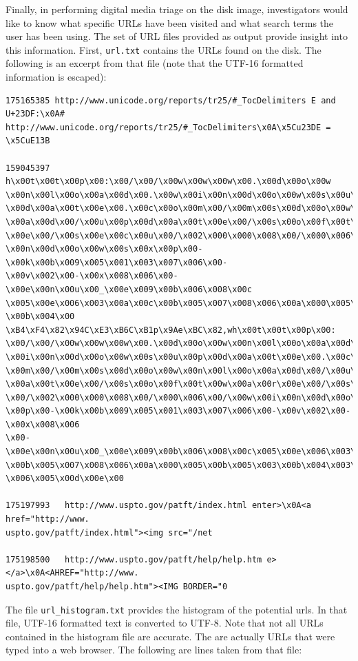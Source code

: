 Finally, in performing digital media triage on the disk image, investigators would like to know what specific URLs have been visited and what search terms the user has been using. The set of URL files provided as output provide insight into this information. First, \texttt{url.txt} contains the URLs found on the disk. The following is an excerpt from that file (note that the UTF-16 formatted information is escaped):
\lstset{style=customfile}
\begin{lstlisting} 
175165385 http://www.unicode.org/reports/tr25/#_TocDelimiters E and U+23DF:\x0A#
http://www.unicode.org/reports/tr25/#_TocDelimiters\x0A\x5Cu23DE = \x5CuE13B

159045397 h\x00t\x00t\x00p\x00:\x00/\x00/\x00w\x00w\x00w\x00.\x00d\x00o\x00w
\x00n\x00l\x00o\x00a\x00d\x00.\x00w\x00i\x00n\x00d\x00o\x00w\x00s\x00u\x00p
\x00d\x00a\x00t\x00e\x00.\x00c\x00o\x00m\x00/\x00m\x00s\x00d\x00o\x00w\x00n\x00l\x00o
\x00a\x00d\x00/\x00u\x00p\x00d\x00a\x00t\x00e\x00/\x00s\x00o\x00f\x00t\x00w\x00a\x00r
\x00e\x00/\x00s\x00e\x00c\x00u\x00/\x002\x000\x000\x008\x00/\x000\x006\x00/\x00w\x00i
\x00n\x00d\x00o\x00w\x00s\x00x\x00p\x00-\x00k\x00b\x009\x005\x001\x003\x007\x006\x00-
\x00v\x002\x00-\x00x\x008\x006\x00-\x00e\x00n\x00u\x00_\x00e\x009\x00b\x006\x008\x00c
\x005\x00e\x006\x003\x00a\x00c\x00b\x005\x007\x008\x006\x00a\x000\x005\x00b\x005\x003
\x00b\x004\x00 \xB4\xF4\x82\x94C\xE3\xB6C\xB1p\x9Ae\xBC\x82,wh\x00t\x00t\x00p\x00:
\x00/\x00/\x00w\x00w\x00w\x00.\x00d\x00o\x00w\x00n\x00l\x00o\x00a\x00d\x00.\x00w
\x00i\x00n\x00d\x00o\x00w\x00s\x00u\x00p\x00d\x00a\x00t\x00e\x00.\x00c\x00o
\x00m\x00/\x00m\x00s\x00d\x00o\x00w\x00n\x00l\x00o\x00a\x00d\x00/\x00u\x00p\x00d
\x00a\x00t\x00e\x00/\x00s\x00o\x00f\x00t\x00w\x00a\x00r\x00e\x00/\x00s\x00e\x00c\x00u
\x00/\x002\x000\x000\x008\x00/\x000\x006\x00/\x00w\x00i\x00n\x00d\x00o\x00w\x00s\x00x
\x00p\x00-\x00k\x00b\x009\x005\x001\x003\x007\x006\x00-\x00v\x002\x00-\x00x\x008\x006
\x00-\x00e\x00n\x00u\x00_\x00e\x009\x00b\x006\x008\x00c\x005\x00e\x006\x003\x00a\x00c
\x00b\x005\x007\x008\x006\x00a\x000\x005\x00b\x005\x003\x00b\x004\x003\x003\x002\x004
\x006\x005\x00d\x00e\x00

175197993	http://www.uspto.gov/patft/index.html enter>\x0A<a href="http://www.
uspto.gov/patft/index.html"><img src="/net

175198500	http://www.uspto.gov/patft/help/help.htm e></a>\x0A<AHREF="http://www.
uspto.gov/patft/help/help.htm"><IMG BORDER="0
\end{lstlisting}
The file \texttt{url\_histogram.txt} provides the histogram of the potential urls. In that file, UTF-16 formatted text is converted to UTF-8. Note that not all URLs contained in the histogram file are accurate. The are actually URLs that were typed into a web browser. The following are lines taken from that file:
